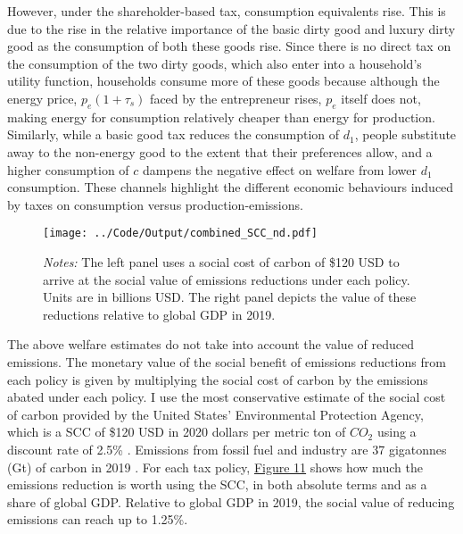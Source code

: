 \documentclass[12pt,a4paper]{article}
\begin{document}
\hspace*{6mm}  However, under the shareholder-based tax, consumption equivalents rise. This is due to the rise in the relative importance of the basic dirty good and luxury dirty good as the consumption of both these goods rise. Since there is no direct tax on the consumption of the two dirty goods, which also enter into a household's utility function, households consume more of these goods because although the energy price, $p_e(1+\tau_s)$ faced by the entrepreneur rises, $p_e$ itself does not, making energy for consumption relatively cheaper than energy for production. Similarly, while a basic good tax reduces the consumption of $d_1$, people substitute away to the non-energy good to the extent that their preferences allow, and a higher consumption of $c$ dampens the negative effect on welfare from lower $d_1$ consumption. These channels highlight the different economic behaviours induced by taxes on consumption versus production-emissions.


\begin{figure}[h! tbp]
    \centering
    
    \texttt{[image: ../Code/Output/combined\_SCC\_nd.pdf]} 
    \captionsetup{font=footnotesize}
    \caption*{\textit{Notes:} The left panel uses a social cost of carbon of \$120 USD to arrive at the social value of emissions reductions under each policy. Units are in billions USD. The right panel depicts the value of these reductions relative to global GDP in 2019.}
          \label{fig:SCC}
\end{figure}

\hspace*{6mm}  The above welfare estimates do not take into account the value of reduced emissions.  The monetary value of the social benefit of emissions reductions from each policy is given by multiplying the social cost of carbon by the emissions abated under each policy. I use the most conservative estimate of the social cost of carbon provided by the United States' Environmental Protection Agency, which is a SCC of \$120 USD in 2020 dollars per metric ton of $CO_2$ using a discount rate of 2.5\% \citep{epa2023socialcost}.  Emissions from fossil fuel and industry are 37 gigatonnes (Gt) of carbon in 2019 \citep{ipcc2023ar6wg3}. For each tax policy, \hyperref[fig:SCC]{Figure 11} shows how much the emissions reduction is worth using the SCC, in both absolute terms and as a share of global GDP. Relative to global GDP in 2019, the social value of reducing emissions can reach up to 1.25\%.
\end{document}
